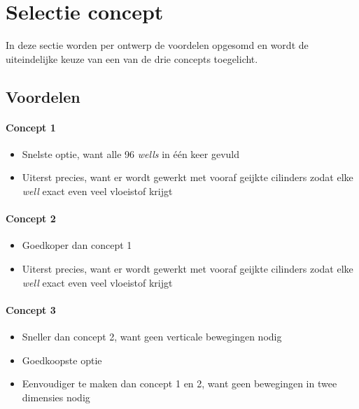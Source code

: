 \documentclass[a4paper,twoside,kulak]{kulakreport} %
\begin{document}
\section{Selectie concept}
In deze sectie worden per ontwerp de voordelen opgesomd en wordt de uiteindelijke keuze van een van de drie concepts toegelicht.

\subsection{Voordelen}

\paragraph{Concept 1}
\begin{itemize}
	\item Snelste optie, want alle 96 \textit{wells} in één keer gevuld
	\item Uiterst precies, want er wordt gewerkt met vooraf geijkte cilinders zodat elke 	\textit{well} exact even veel vloeistof krijgt
\end{itemize}

\paragraph{Concept 2}
\begin{itemize}
	\item Goedkoper dan concept 1
	\item Uiterst precies, want er wordt gewerkt met vooraf geijkte cilinders zodat elke 	\textit{well} exact even veel vloeistof krijgt
\end{itemize}

\paragraph{Concept 3}
\begin{itemize}
	\item Sneller dan concept 2, want geen verticale bewegingen nodig
	\item Goedkoopste optie
	\item Eenvoudiger te maken dan concept 1 en 2, want geen bewegingen in twee dimensies nodig
\end{itemize}
\end{document}
